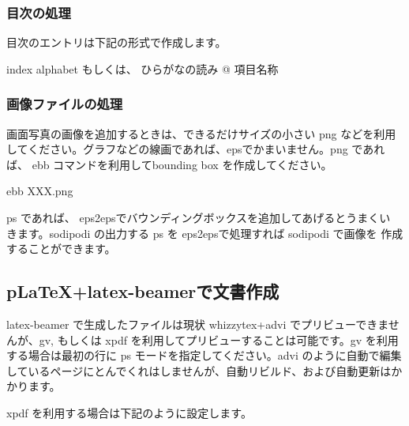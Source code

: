 \documentclass[mingoth,a4paper]{jsarticle}
\begin{document}
\begin{commandline}
 \label{sec:debmtg2007howtoprepare}
\end{commandline}

\subsubsection{目次の処理}

目次のエントリは下記の形式で作成します。
\begin{commandline}
index { alphabet もしくは、 ひらがなの読み @ 項目名称 } 
\end{commandline}

\subsubsection{画像ファイルの処理}

画面写真の画像を追加するときは、できるだけサイズの小さい png などを利用
してください。グラフなどの線画であれば、epsでかまいません。png であれば、 
ebb コマンドを利用してbounding box を作成してください。

\begin{commandline}
 ebb XXX.png
\end{commandline}

ps であれば、 eps2epsでバウンディングボックスを追加してあげるとうまくい
きます。sodipodi の出力する ps を eps2epsで処理すれば sodipodi で画像を
作成することができます。

\subsection{pLaTeX+latex-beamerで文書作成}

latex-beamer で生成したファイルは現状 whizzytex+advi でプリビューできませ
んが、gv, もしくは xpdf を利用してプリビューすることは可能です。gv を利用
する場合は最初の行に ps モードを指定してください。advi のように自動で編集
しているページにとんでくれはしませんが、自動リビルド、および自動更新はか
かります。

\begin{commandline}
\end{commandline}

xpdf を利用する場合は下記のように設定します。

\begin{commandline}
\end{commandline}
\end{document}
